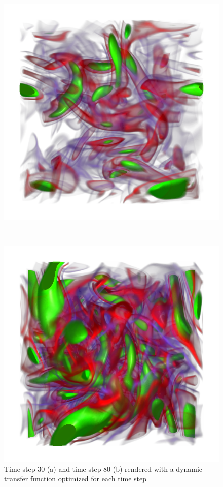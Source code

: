 \begin{figure}
	\centering
	\begin{minipage}{.5\textwidth}
		\includegraphics[width=1\linewidth]{images/vorts30_optimized_parallelsearch}
		\subcaption{}
	\end{minipage}~
	\begin{minipage}{.5\textwidth}
		\includegraphics[width=1\linewidth]{images/vorts80_optimized_parallelsearch}
		\subcaption{}
	\end{minipage}
	\caption{Time step 30 (a) and time step 80 (b) rendered with a dynamic transfer function optimized for each time step}
	\label{fig:vorts_50_80_dynamic}
\end{figure}

